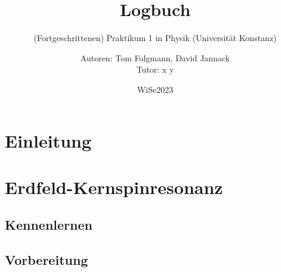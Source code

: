 \documentclass[
    twoside=true, 
    footinclude=off, 
    captions=tableheading, 
    DIV=12;usenames,
    dvipsnames
]{scrartcl}
\begin{document}
    \title{Logbuch}
    \subtitle{(Fortgeschrittenen) Praktikum 1 in Physik (Universität Konstanz)}
    \author{Autoren: Tom Folgmann, David Jannack \\ \large{Tutor: x y}}
    \date{WiSe2023}
    \maketitle
    \thispagestyle{empty}
    \section*{Einleitung}
        

    \newpage


    \tableofcontents
    \thispagestyle{empty}	
    \newpage
    \setcounter{page}{1}

\newtheorem{quest}{Vorbereitungsthema}
\newtheorem{answ}{Antwort }
\newenvironment{Frage}{%
    \begin{center}
        \begin{minipage}{0.95\textwidth}
            \dotfill
            \begin{quest}\end{quest}
}{
            
            \dotfill
        \end{minipage}
    \end{center}
}
\newenvironment{Antwort}{}{}



\newpage
\section{Erdfeld-Kernspinresonanz}
    \subsection*{Kennenlernen}
        
    
    \subsection*{Vorbereitung}
        



%
\end{document}
